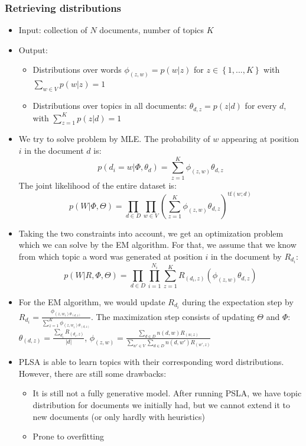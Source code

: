 \subsubsection{Retrieving distributions}
\begin{itemize}
	\item Input: collection of $N$ documents, number of topics $K$
	\item Output:
	\begin{itemize}
		\item Distributions over words $\phi_{(z,w)} = p(w|z)$ for $z\in \left\{1,...,K\right\}$ with $\sum_{w\in V} p(w|z) = 1$
		\item Distributions over topics in all documents: $\theta_{d,z} = p(z|d)$ for every $d$, with $\sum_{z=1}^{K} p(z|d) = 1$
	\end{itemize} 
	\item We try to solve problem by MLE. The probability of $w$ appearing at position $i$ in the document $d$ is:
	$$p(d_i = w | \Phi, \theta_d) = \sum\limits_{z=1}^{K} \phi_{(z,w)} \theta_{d,z}$$
	The joint likelihood of the entire dataset is:
	$$p(W|\Phi, \Theta) = \prod\limits_{d\in D}\prod\limits_{w\in V}\left(\sum\limits_{z=1}^{K} \phi_{(z,w)} \theta_{d,z}\right)^{\text{tf}(w;d)} $$
	\item Taking the two constraints into account, we get an optimization problem which we can solve by the EM algorithm. For that, we assume that we know from which topic a word was generated at position $i$ in the document by $R_{d_i}$:
	$$p(W|R,\Phi,\Theta) = \prod\limits_{d\in D}\prod\limits_{i=1}^{N_i}\sum\limits_{z=1}^{K} R_{(d_i,z)} \left(\phi_{(z,w)} \theta_{d,z}\right)$$
	\item For the EM algorithm, we would update $R_{d_i}$ during the expectation step by $R_{d_i} = \frac{\phi_{(z,w_i)\theta_{(d,z)}}}{\sum_{z=1}^{K} \phi_{(z,w_i)\theta_{(d,z)}}}$. The maximization step consists of updating $\Theta$ and $\Phi$: $\theta_{(d,z)} = \frac{\sum_{d_i} R_{(d_i,z)}}{|d|}$, $\phi_{(z,w)} = \frac{\sum_{d \in D} n(d,w) R_{(w,z)}}{\sum_{w' \in V} \sum_{d \in D} n(d,w')R_{(w',z)}}$
	\item PLSA is able to learn topics with their corresponding word distributions. However, there are still some drawbacks:
	\begin{itemize}
		\item It is still not a fully generative model. After running PSLA, we have topic distribution for documents we initially had, but we cannot extend it to new documents (or only hardly with heuristics)
		\item Prone to overfitting
	\end{itemize}
\end{itemize}
